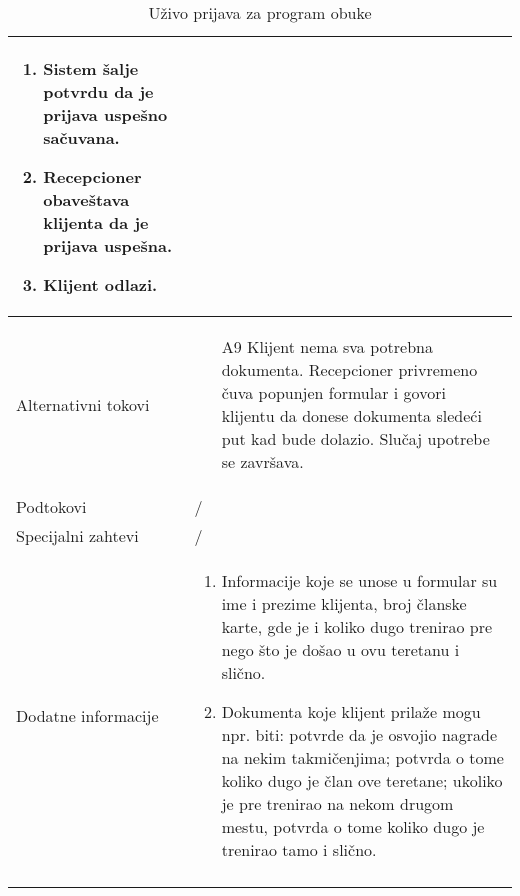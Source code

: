 \documentclass[../../main.tex]{subfiles}
\begin{document}
\begin{longtable}{| p{} | p{} |}
\begin{enumerate}
        \item Sistem šalje potvrdu da je prijava uspešno sačuvana.
        \item Recepcioner obaveštava klijenta da je prijava uspešna.
        \item Klijent odlazi.
    \end{enumerate}\\
\hline
    Alternativni tokovi & 
    \begin{itemize}
        \item[A9] Klijent nema sva potrebna dokumenta. Recepcioner privremeno čuva popunjen formular i govori klijentu da donese dokumenta sledeći put kad bude dolazio. Slučaj upotrebe se završava. 
    \end{itemize} \\
\hline
    Podtokovi & /\\
\hline
    Specijalni zahtevi & /\\
\hline
    Dodatne informacije &
    \begin{enumerate}
        \item Informacije koje se unose u formular su ime i prezime klijenta, broj članske karte, gde je i koliko dugo trenirao pre nego što je došao u ovu teretanu i slično.
        \item Dokumenta koje klijent prilaže mogu npr. biti: potvrde da je osvojio nagrade na nekim takmičenjima; potvrda o tome koliko dugo je član ove teretane; ukoliko je pre trenirao na nekom drugom mestu, potvrda o tome koliko dugo je trenirao tamo i slično.
    \end{enumerate}\\
\hline
\caption{Uživo prijava za program obuke}
\end{longtable}
\end{document}
